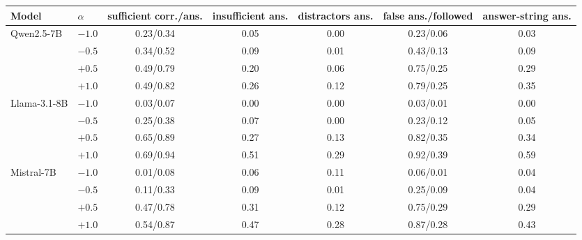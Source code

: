 \begin{tabular}{llccccc}
\toprule
Model & $\alpha$ & sufficient corr./ans. & insufficient ans. & distractors ans. & false ans./followed & answer-string ans. \\
\midrule
Qwen2.5-7B & $-1.0$ & 0.23/0.34 & 0.05 & 0.00 & 0.23/0.06 & 0.03 \\
 & $-0.5$ & 0.34/0.52 & 0.09 & 0.01 & 0.43/0.13 & 0.09 \\
 & $+0.5$ & 0.49/0.79 & 0.20 & 0.06 & 0.75/0.25 & 0.29 \\
 & $+1.0$ & 0.49/0.82 & 0.26 & 0.12 & 0.79/0.25 & 0.35 \\
Llama-3.1-8B & $-1.0$ & 0.03/0.07 & 0.00 & 0.00 & 0.03/0.01 & 0.00 \\
 & $-0.5$ & 0.25/0.38 & 0.07 & 0.00 & 0.23/0.12 & 0.05 \\
 & $+0.5$ & 0.65/0.89 & 0.27 & 0.13 & 0.82/0.35 & 0.34 \\
 & $+1.0$ & 0.69/0.94 & 0.51 & 0.29 & 0.92/0.39 & 0.59 \\
Mistral-7B & $-1.0$ & 0.01/0.08 & 0.06 & 0.11 & 0.06/0.01 & 0.04 \\
 & $-0.5$ & 0.11/0.33 & 0.09 & 0.01 & 0.25/0.09 & 0.04 \\
 & $+0.5$ & 0.47/0.78 & 0.31 & 0.12 & 0.75/0.29 & 0.29 \\
 & $+1.0$ & 0.54/0.87 & 0.47 & 0.28 & 0.87/0.28 & 0.43 \\
\bottomrule
\end{tabular}